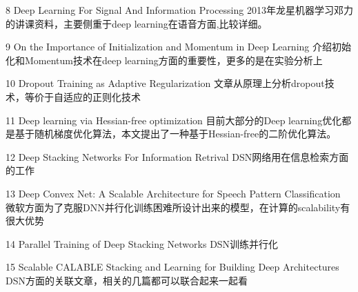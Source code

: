 8 Deep Learning For Signal And Information Processing
  2013年龙星机器学习邓力的讲课资料，主要侧重于deep learning在语音方面,比较详细。

9 On the Importance of Initialization and Momentum in Deep Learning
  介绍初始化和Momentum技术在deep learning方面的重要性，更多的是在实验分析上

10 Dropout Training as Adaptive Regularization
   文章从原理上分析dropout技术，等价于自适应的正则化技术

11 Deep learning via Hessian-free optimization
   目前大部分的Deep learning优化都是基于随机梯度优化算法，本文提出了一种基于Hessian-free的二阶优化算法。

12 Deep Stacking Networks For Information Retrival
  DSN网络用在信息检索方面的工作

13 Deep Convex Net: A Scalable Architecture for Speech Pattern Classification
  微软方面为了克服DNN并行化训练困难所设计出来的模型，在计算的scalability有很大优势

14 Parallel Training of Deep Stacking Networks
  DSN训练并行化

15 Scalable CALABLE Stacking and Learning for Building Deep Architectures
  DSN方面的关联文章，相关的几篇都可以联合起来一起看

\ifx\mlnotes\undefined
    
\fi
